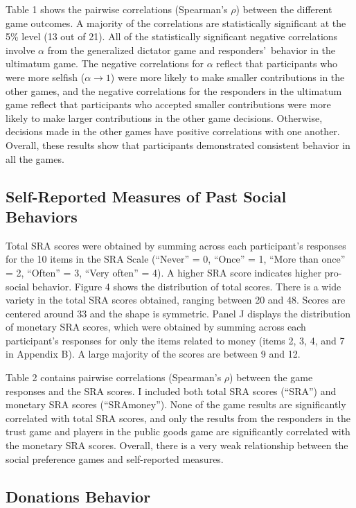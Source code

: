 \documentclass[12pt]{article}
\begin{document}
Table 1 shows the pairwise correlations (Spearman\rq s \(\rho\)) between the different game outcomes. A majority of the correlations are statistically significant at the 5\% level (13 out of 21). All of the statistically significant negative correlations involve \(\alpha\) from the generalized dictator game and responders\rq \ behavior in the ultimatum game. The negative correlations for \(\alpha\) reflect that participants who were more selfish (\(\alpha \rightarrow 1\)) were more likely to make smaller contributions in the other games, and the negative correlations for the responders in the ultimatum game reflect that participants who accepted smaller contributions were more likely to make larger contributions in the other game decisions. Otherwise, decisions made in the other games have positive correlations with one another. Overall, these results show that participants demonstrated consistent behavior in all the games.

\subsection{Self-Reported Measures of Past Social Behaviors}

Total SRA scores were obtained by summing across each participant\rq s responses for the 10 items in the SRA Scale (``Never'' = 0, ``Once'' = 1, ``More than once'' = 2, ``Often'' = 3, ``Very often'' = 4). A higher SRA score indicates higher pro-social behavior. Figure 4 shows the distribution of total scores. There is a wide variety in the total SRA scores obtained, ranging between 20 and 48. Scores are centered around 33 and the shape is symmetric. Panel J displays the distribution of monetary SRA scores, which were obtained by summing across each participant\rq s responses for only the items related to money (items 2, 3, 4, and 7 in Appendix B).  A large majority of the scores are between 9 and 12.

Table 2 contains pairwise correlations (Spearman\rq s \(\rho\)) between the game responses and the SRA scores. I included both total SRA scores (``SRA'') and monetary SRA scores (``SRAmoney''). None of the game results are significantly correlated with total SRA scores, and only the results from the responders in the trust game and players in the public goods game are significantly correlated with the monetary SRA scores. Overall, there is a very weak relationship between the social preference games and self-reported measures. 

\subsection{Donations Behavior}
\end{document}
